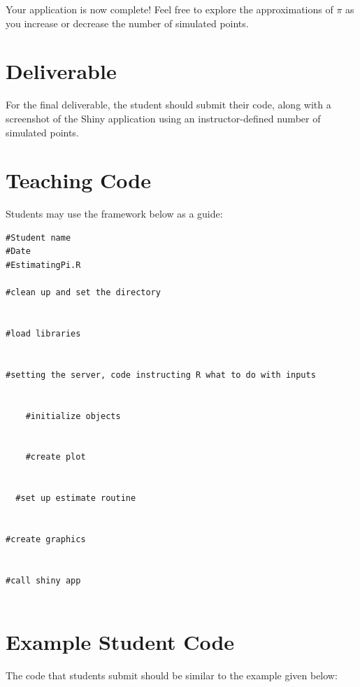 \noindent Your application is now complete!
Feel free to explore the approximations of $\pi$ as you increase or decrease the number of simulated points. 

\section{Deliverable}

For the final deliverable, the student should submit their code, along with a screenshot of the Shiny application using an instructor-defined number of simulated points.

\section{Teaching Code}

Students may use the framework below as a guide:

\begin{lstlisting}
#Student name
#Date
#EstimatingPi.R

#clean up and set the directory


#load libraries


#setting the server, code instructing R what to do with inputs


    #initialize objects
   
    
    #create plot
    
  
  #set up estimate routine  
  

#create graphics


#call shiny app


\end{lstlisting}

\section{Example Student Code}

The code that students submit should be similar to the example given below:


